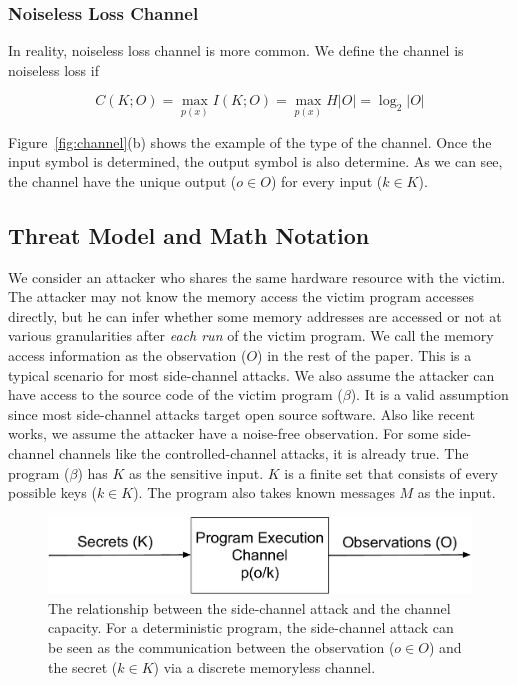 \subsubsection{Noiseless Loss Channel}
In reality, noiseless loss channel is more common. We define the channel is noiseless loss if

\begin{equation} \label{chapter:eq:5}
  C(K;O) = \max_{p(x)} I(K;O) = \max_{p(x)} H |O| = \log_2 {|O|}
\end{equation}

Figure~\ref{fig:channel}(b) shows the example of the type of the channel. Once the input symbol is determined, the output symbol is also determine. As we can see, the channel have the unique output ($o \in O$) for every input ($k \in K$).


\subsection{Threat Model and Math Notation}


We consider an attacker who shares the same hardware resource with the victim. The attacker may not know the memory access the victim program accesses directly, but he can infer whether some memory addresses are accessed or not at various granularities after \textit{each run} of the victim program. We call the memory access information as the observation ($O$) in the rest of the paper. This is a typical scenario for most side-channel attacks.  We also assume the attacker can have access to the source code of the victim program ($\beta$). It is a valid assumption since most side-channel attacks target open source software. Also like recent works, we assume the attacker have a noise-free observation. For some side-channel channels like the controlled-channel attacks, it is already true. The program ($\beta$) has $K$ as the sensitive input. $K$ is a finite set that consists of every possible keys ($k \in K$). The program also takes known messages $M$ as the input.

\begin{figure}[ht]
  \centering
  \includegraphics[width=\columnwidth]{./figures/chapter5/channel.pdf}
  \caption{The relationship between the side-channel attack and the channel capacity. For a deterministic program, the side-channel attack can be seen as the communication between the observation ($o \in O$) and the secret ($k \in K$) via a discrete memoryless channel.}
  \label{fig:side_channel}
\end{figure}


